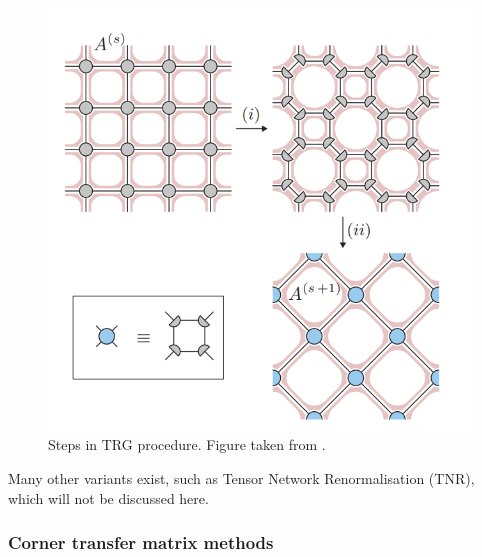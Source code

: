 \begin{figure}[!htbp]
    \center
    \includegraphics[width=0.8 \textwidth]{Figuren/tnalgs/TRG.png}
    \caption{ Steps in TRG procedure. Figure taken from \cite{Hauru}.  }
    \label{fig:tnalgs:trg}
\end{figure}
Many other variants exist, such as Tensor Network Renormalisation (TNR), which will not be discussed here.

\subsubsection{Corner transfer matrix  methods}

